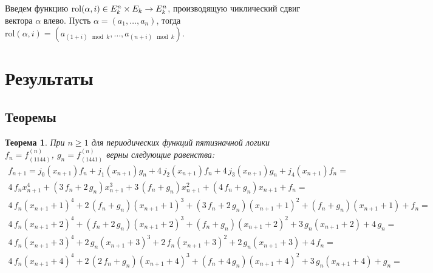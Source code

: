 \documentclass[a4paper, 12pt]{article}
\newtheorem{myth}{Теорема}
\newcommand{\rol} {\textrm{rol}}
\def\times{\mathchar8706\nobreak\discretionary{}{\usefont{OMS}{cmsy}{m}{n}\char2}{}}
\def\in{\mathchar"3232\nobreak\discretionary{}{\usefont{OMS}{cmsy}{m}{n}\char50}{}}
\begin{document}
Введем функцию $\rol(\alpha, i) \in E_k^n \times E_k \rightarrow E_k^n$, производящую чиклический сдвиг вектора $\alpha$
влево. Пусть $\alpha = (a_1, \dots, a_n)$, тогда $\rol(\alpha, i) = (a_{(1+i)\mod k}, \dots, a_{(n+i)\mod k})$.

\section{Результаты}
\subsection{Теоремы}

\begin{myth} При $n \geqslant 1 $ для периодических функций пятизначной логики $f_n = f^{\left(n\right)}_{\left(1144\right)}$,
$g_n = f^{\left(n\right)}_{\left(1441\right)}$ верны следующие равенства:
$$\begin{array}{l}
 f_{n+1} = j_0(x_{n+1})f_n + j_1(x_{n+1})g_n + 4\,j_2(x_{n+1})f_n + 4\,j_3(x_{n+1})g_n + j_4(x_{n+1})f_n =\\
4 \, f_{n} x_{n+1}^{4} + {\left(3 \, f_{n} + 2 \, g_{n}\right)} x_{n+1}^{3} + 3 \, {\left(f_{n} + g_{n}\right)} x_{n+1}^{2} + {\left(4 \, f_{n} + g_{n}\right)} x_{n+1} + f_{n}=\\
4 \, f_{n} {\left(x_{n+1} + 1\right)}^{4} + 2 \, {\left(f_{n} + g_{n}\right)} {\left(x_{n+1} + 1\right)}^{3} + {\left(3 \, f_{n} + 2 \, g_{n}\right)} {\left(x_{n+1} + 1\right)}^{2} + {\left(f_{n} + g_{n}\right)} {\left(x_{n+1} + 1\right)} + f_{n}=\\
4 \, f_{n} {\left(x_{n+1} + 2\right)}^{4} + {\left(f_{n} + 2 \, g_{n}\right)} {\left(x_{n+1} + 2\right)}^{3} + {\left(f_{n} + g_{n}\right)} {\left(x_{n+1} + 2\right)}^{2} + 3 \, g_{n} {\left(x_{n+1} + 2\right)} + 4 \, g_{n}=\\
4 \, f_{n} {\left(x_{n+1} + 3\right)}^{4} + 2 \, g_{n} {\left(x_{n+1} + 3\right)}^{3} + 2 \, f_{n} {\left(x_{n+1} + 3\right)}^{2} + 2 \, g_{n} {\left(x_{n+1} + 3\right)} + 4 \, f_{n}=\\
4 \, f_{n} {\left(x_{n+1} + 4\right)}^{4} + 2 \, {\left(2 \, f_{n} + g_{n}\right)} {\left(x_{n+1} + 4\right)}^{3} + {\left(f_{n} + 4 \, g_{n}\right)} {\left(x_{n+1} + 4\right)}^{2} + 3 \, g_{n} {\left(x_{n+1} + 4\right)} + g_{n}=\\
\end{array}$$
\end{myth}
\end{document}
